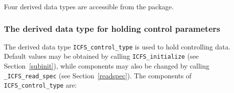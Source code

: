 \documentclass{galahad}
\newcommand{\packagename}{ICFS}
\newcommand{\fullpackagename}{\libraryname\_\packagename}
\begin{document}

\galtypes
Four derived data types are accessible from the package.


\subsubsection{The derived data type for holding control
 parameters}\label{typecontrol}
The derived data type
{\tt \packagename\_control\_type}
is used to hold controlling data. Default values may be obtained by calling
{\tt \packagename\_initialize}
(see Section~\ref{subinit}),
while components may also be changed by calling
{\tt \fullpackagename\_read\-\_spec}
(see Section~\ref{readspec}).
The components of
{\tt \packagename\_control\_type}
are:
\end{document}
